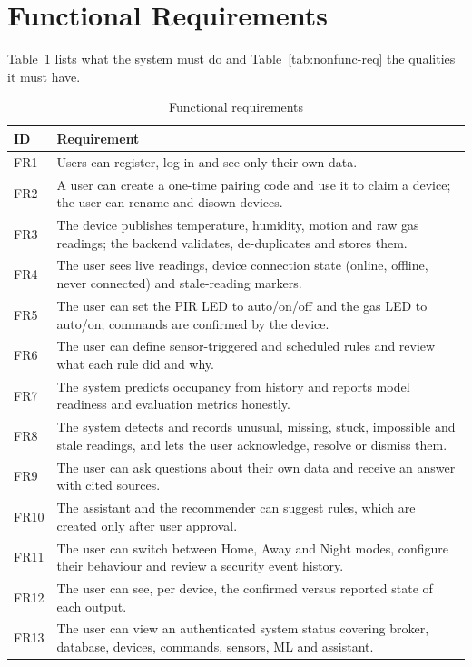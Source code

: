 \documentclass[12pt,a4paper,oneside]{report}
\begin{document}
\section{Functional Requirements}
Table~\ref{tab:func-req} lists what the system must do and Table~\ref{tab:nonfunc-req} the qualities it must have.
\begin{table}[H]
\centering
\caption{Functional requirements}
\label{tab:func-req}
\begin{tabularx}{\textwidth}{lX}
\toprule
\textbf{ID} & \textbf{Requirement}\\
\midrule
FR1 & Users can register, log in and see only their own data.\\
FR2 & A user can create a one-time pairing code and use it to claim a device; the user can rename and disown devices.\\
FR3 & The device publishes temperature, humidity, motion and raw gas readings; the backend validates, de-duplicates and stores them.\\
FR4 & The user sees live readings, device connection state (online, offline, never connected) and stale-reading markers.\\
FR5 & The user can set the PIR LED to auto/on/off and the gas LED to auto/on; commands are confirmed by the device.\\
FR6 & The user can define sensor-triggered and scheduled rules and review what each rule did and why.\\
FR7 & The system predicts occupancy from history and reports model readiness and evaluation metrics honestly.\\
FR8 & The system detects and records unusual, missing, stuck, impossible and stale readings, and lets the user acknowledge, resolve or dismiss them.\\
FR9 & The user can ask questions about their own data and receive an answer with cited sources.\\
FR10 & The assistant and the recommender can suggest rules, which are created only after user approval.\\
FR11 & The user can switch between Home, Away and Night modes, configure their behaviour and review a security event history.\\
FR12 & The user can see, per device, the confirmed versus reported state of each output.\\
FR13 & The user can view an authenticated system status covering broker, database, devices, commands, sensors, ML and assistant.\\
\bottomrule
\end{tabularx}
\end{table}
\end{document}
